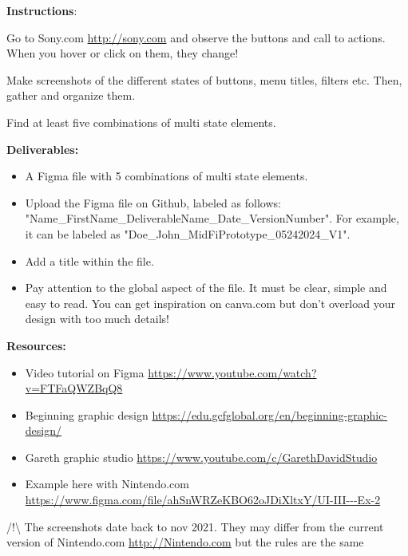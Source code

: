 \makeheaderfiles

\textbf{Instructions}:

Go to Sony.com \url{http://sony.com} and observe the buttons and call to actions. When you hover or click on them, they change!

Make screenshots of the different states of buttons, menu titles, filters etc. Then, gather and organize them.

Find at least five combinations of multi state elements.

\textbf{Deliverables:}

\begin{itemize}
\item A Figma file with 5 combinations of multi state elements.
\item Upload the Figma file on Github, labeled as follows: "Name\_FirstName\_DeliverableName\_Date\_VersionNumber". For example, it can be labeled as "Doe\_John\_MidFiPrototype\_05242024\_V1".
\item Add a title within the file.
\item Pay attention to the global aspect of the file. It must be clear, simple and easy to read. You can get inspiration on canva.com but don't overload your design with too much details!
\end{itemize}

\textbf{Resources:}

\begin{itemize}
\item Video tutorial on Figma \url{https://www.youtube.com/watch?v=FTFaQWZBqQ8}
\item Beginning graphic design \url{https://edu.gcfglobal.org/en/beginning-graphic-design/}
\item Gareth graphic studio \url{https://www.youtube.com/c/GarethDavidStudio}
\item Example here with Nintendo.com \url{https://www.figma.com/file/ahSnWRZeKBO62oJDiXltxY/UI-III---Ex-2}
\end{itemize}

/!\textbackslash{} The screenshots date back to nov 2021. They may differ from the current version of Nintendo.com \url{http://Nintendo.com} but the rules are the same

